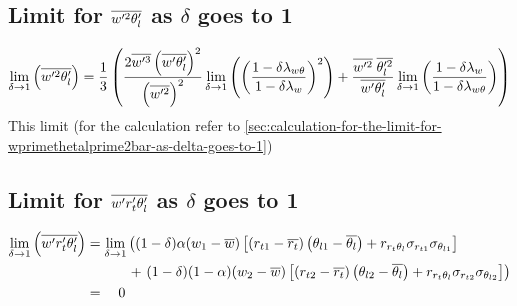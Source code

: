 \subsection{Limit for \texorpdfstring{$\overline{w'^2 \theta_l'}$}{wprimethetaltwobar} as \texorpdfstring{$\delta$}{delta} goes to 1}
\label{subsec:limit-for-wprimethetal2bar-as-delta-goes-to-1}

\begin{align}
    \label{eq:limit_wprimethetalprime2bar_delta_to_1}
    \lim_{\delta \to 1}\left(\overline{w'^2 \theta_l'}\right)
    = \frac{1}{3}\left(
    \frac{2 \overline{w'^3} \left(\overline{w' \theta_l'} \right)^2}{\left(\overline{w'^2} \right)^2} \lim_{\delta \to 1}
    \left(\left(\frac{1-\delta \lambda_{w \theta}}{1-\delta \lambda_w}\right)^2\right) +
    \frac{\overline{w'^2} \; \overline{\theta_l'^2}}{\overline{w' \theta_l'}}
    \lim_{\delta \to 1}
    \left(\frac{1-\delta \lambda_w}{1-\delta \lambda_{w \theta}}\right)
    \right)
\end{align}
This limit (for the calculation refer to \cref{sec:calculation-for-the-limit-for-wprimethetalprime2bar-as-delta-goes-to-1})

\subsection{Limit for \texorpdfstring{$\overline{w' r_t' \theta_l'}$}{wprimertprimethetalbar} as \texorpdfstring{$\delta$}{delta} goes to 1}
\label{subsec:limit-for-wprimertprimethetalbar-as-delta-goes-to-1}

\begin{align}
    \label{eq:limit_wprimertprimethetalbar_delta_to_1}
    \lim_{\delta \to 1}\left(\overline{w' r_t' \theta_l'}\right)
    &= \lim_{\delta \to 1}
    \left(
    (1 - \delta) \alpha (w_1 - \overline{w}) \left[
        \left(r_{t1} - \overline{r_t}\right)
        \left(\theta_{l1} - \overline{\theta_l}\right) +
        r_{r_t \theta_l} \sigma_{r_{t1}} \sigma_{\theta_{l1}}
        \right] \right.\nonumber\\
    &\quad\quad\quad+ \left.(1 - \delta) (1 - \alpha) (w_2 - \overline{w}) \left[
        \left(r_{t2} - \overline{r_t}\right)
        \left(\theta_{l2} - \overline{\theta_l}\right) +
        r_{r_t \theta_l} \sigma_{r_{t2}} \sigma_{\theta_{l2}}
        \right]
    \right) \nonumber\\
    &=\quad 0
\end{align}